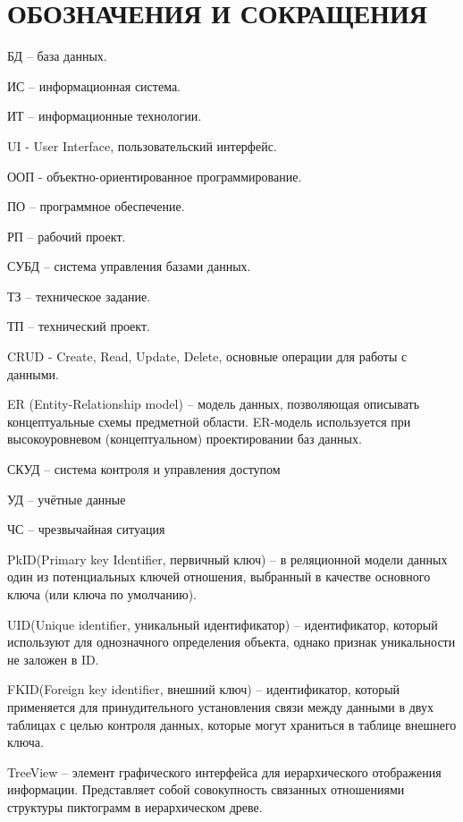 \section*{ОБОЗНАЧЕНИЯ И СОКРАЩЕНИЯ}

БД -- база данных.

ИС -- информационная система.

ИТ -- информационные технологии. 

UI - User Interface, пользовательский интерфейс.

ООП - объектно-ориентированное программирование.

ПО -- программное обеспечение.

РП -- рабочий проект.

СУБД -- система управления базами данных.

ТЗ -- техническое задание.

ТП -- технический проект.

CRUD - Create, Read, Update, Delete, основные операции для работы с данными.

ER (Entity-Relationship model) -- модель данных, позволяющая описывать концептуальные схемы предметной области. ER-модель используется при высокоуровневом (концептуальном) проектировании баз данных.

СКУД -- система контроля и управления доступом

УД -- учётные данные

ЧС -- чрезвычайная ситуация

PkID(Primary key Identifier, первичный ключ) -- в реляционной модели данных один из потенциальных ключей отношения, выбранный в качестве основного ключа (или ключа по умолчанию).

UID(Unique identifier, уникальный идентификатор) -- идентификатор, который используют для однозначного определения объекта, однако признак уникальности не заложен в ID.

FKID(Foreign key identifier, внешний ключ) -- идентификатор, который применяется для принудительного установления связи между данными в двух таблицах с целью контроля данных, которые могут храниться в таблице внешнего ключа.

TreeView -- элемент графического интерфейса для иерархического отображения информации. Представляет собой совокупность связанных отношениями структуры пиктограмм в иерархическом древе.